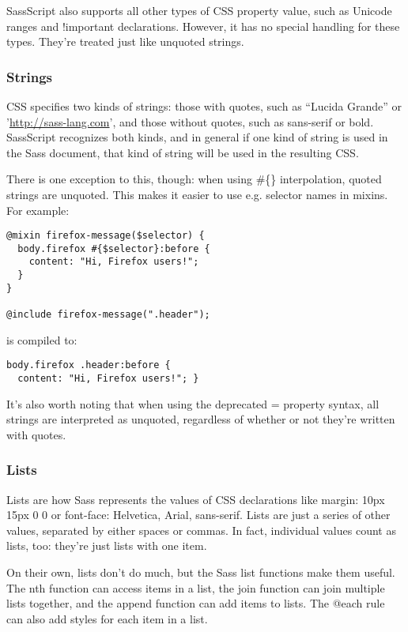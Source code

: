 \documentclass[10pt]{article}
\begin{document}
 SassScript also supports all other types of CSS property value, such as Unicode ranges and !important declarations. However, it has no special handling for these types. They’re treated just like unquoted strings.
\subsubsection{Strings}


 CSS specifies two kinds of strings: those with quotes, such as ``Lucida Grande'' or '\url{http://sass-lang.com}', and those without quotes, such as sans-serif or bold. SassScript recognizes both kinds, and in general if one kind of string is used in the Sass document, that kind of string will be used in the resulting CSS.


 There is one exception to this, though: when using \#\{\} interpolation, quoted strings are unquoted. This makes it easier to use e.g. selector names in mixins. For example:
\begin{verbatim}
@mixin firefox-message($selector) {
  body.firefox #{$selector}:before {
    content: "Hi, Firefox users!";
  }
}

@include firefox-message(".header");
\end{verbatim}


 is compiled to:
\begin{verbatim}
body.firefox .header:before {
  content: "Hi, Firefox users!"; }
\end{verbatim}


 It’s also worth noting that when using the deprecated = property syntax, all strings are interpreted as unquoted, regardless of whether or not they’re written with quotes.
\subsubsection{Lists}


 Lists are how Sass represents the values of CSS declarations like margin: 10px 15px 0 0 or font-face: Helvetica, Arial, sans-serif. Lists are just a series of other values, separated by either spaces or commas. In fact, individual values count as lists, too: they’re just lists with one item.


 On their own, lists don’t do much, but the Sass list functions make them useful. The nth function can access items in a list, the join function can join multiple lists together, and the append function can add items to lists. The @each rule can also add styles for each item in a list.
\end{document}
